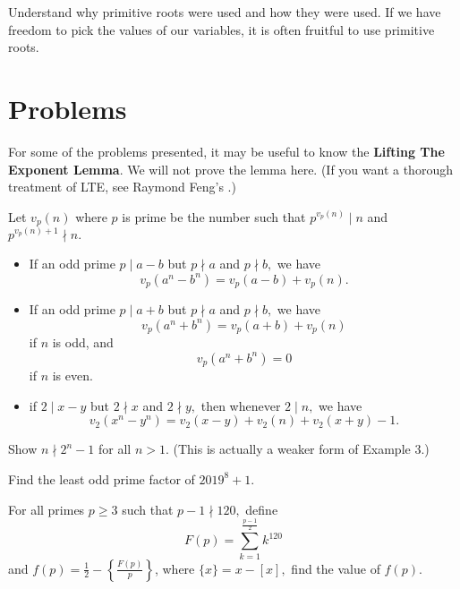 \documentclass{article}
\begin{document}
Understand why primitive roots were used and how they were used. If we have freedom to pick the values of our variables, it is often fruitful to use primitive roots.

\pagebreak

\section{Problems}

For some of the problems presented, it may be useful to know the \textbf{Lifting The Exponent Lemma}. We will not prove the lemma here. (If you want a thorough treatment of LTE, see Raymond Feng's .)

\begin{theo}
Let $v_p(n)$ where $p$ is prime be the number such that $p^{v_p(n)} \mid n$ and $p ^{v_p(n)+1} \nmid n.$

\begin{itemize}
    \item If an odd prime $p \mid a-b$ but $p \nmid a$ and $p \nmid b,$ we have $$v_p(a^n - b^n) = v_p(a-b)+v_p(n).$$
    
    \item If an odd prime $p \mid a+b$ but $p \nmid a$ and $p \nmid b,$ we have $$v_p(a^n + b^n) = v_p(a+b)+v_p(n)$$ if $n$ is odd, and $$v_p(a^n + b^n) = 0$$ if $n$ is even.
    
    \item if $2 \mid x - y$ but $2 \nmid x$ and $2 \nmid y,$ then whenever $2 \mid n,$ we have $$v_2(x^n-y^n) = v_2(x-y)+v_2(n)+v_2(x+y)-1.$$
\end{itemize}
\end{theo}

\noindent{}

     
\begin{prob}[]{1}
Show $n \nmid 2^n-1$ for all $n>1.$ (This is actually a weaker form of Example 3.)
\end{prob}

\begin{prob}[AIME I 2019/14]{2}
Find the least odd prime factor of $2019^8+1$.
\end{prob}

\begin{req}{3}
For all primes $p \geq 3$ such that $p-1 \nmid 120,$ define $$F(p) = \sum^{\frac{p-1}{2}}_{k=1}k^{120}$$ and $f(p) = \frac{1}{2} - \left\{ \frac{F(p)}{p} \right\}$, where $\{x\} = x - [x],$ find the value of $f(p).$
\end{req}
\end{document}
